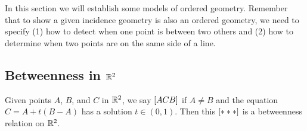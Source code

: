 In this section we will establish some models of ordered geometry.
Remember that to show a given incidence geometry is also an ordered geometry, we need to specify (1) how to detect when one point is between two others and (2) how to determine when two points are on the same side of a line.

\subsection{Betweenness in \(\mathbb{R}^2\)}

\begin{prop}\label{prop:rr2-between}
Given points \(A\), \(B\), and \(C\) in \(\mathbb{R}^2\), we say \([ A C B ]\) if \(A \neq B\) and the equation \(C = A + t(B-A)\) has a solution \(t \in (0,1)\).
Then this \([ \ast \ast \ast ]\) is a betweenness relation on \(\mathbb{R}^2\).
\end{prop}

